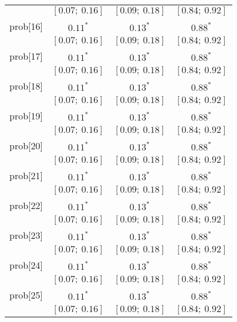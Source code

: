 \begin{table}
\begin{center}
\begin{tabular}{l c c c }
          & $[0.07;\ 0.16]$         & $[0.09;\ 0.18]$         & $[0.84;\ 0.92]$       \\
prob[16]  & $0.11^{*}$              & $0.13^{*}$              & $0.88^{*}$            \\
          & $[0.07;\ 0.16]$         & $[0.09;\ 0.18]$         & $[0.84;\ 0.92]$       \\
prob[17]  & $0.11^{*}$              & $0.13^{*}$              & $0.88^{*}$            \\
          & $[0.07;\ 0.16]$         & $[0.09;\ 0.18]$         & $[0.84;\ 0.92]$       \\
prob[18]  & $0.11^{*}$              & $0.13^{*}$              & $0.88^{*}$            \\
          & $[0.07;\ 0.16]$         & $[0.09;\ 0.18]$         & $[0.84;\ 0.92]$       \\
prob[19]  & $0.11^{*}$              & $0.13^{*}$              & $0.88^{*}$            \\
          & $[0.07;\ 0.16]$         & $[0.09;\ 0.18]$         & $[0.84;\ 0.92]$       \\
prob[20]  & $0.11^{*}$              & $0.13^{*}$              & $0.88^{*}$            \\
          & $[0.07;\ 0.16]$         & $[0.09;\ 0.18]$         & $[0.84;\ 0.92]$       \\
prob[21]  & $0.11^{*}$              & $0.13^{*}$              & $0.88^{*}$            \\
          & $[0.07;\ 0.16]$         & $[0.09;\ 0.18]$         & $[0.84;\ 0.92]$       \\
prob[22]  & $0.11^{*}$              & $0.13^{*}$              & $0.88^{*}$            \\
          & $[0.07;\ 0.16]$         & $[0.09;\ 0.18]$         & $[0.84;\ 0.92]$       \\
prob[23]  & $0.11^{*}$              & $0.13^{*}$              & $0.88^{*}$            \\
          & $[0.07;\ 0.16]$         & $[0.09;\ 0.18]$         & $[0.84;\ 0.92]$       \\
prob[24]  & $0.11^{*}$              & $0.13^{*}$              & $0.88^{*}$            \\
          & $[0.07;\ 0.16]$         & $[0.09;\ 0.18]$         & $[0.84;\ 0.92]$       \\
prob[25]  & $0.11^{*}$              & $0.13^{*}$              & $0.88^{*}$            \\
          & $[0.07;\ 0.16]$         & $[0.09;\ 0.18]$         & $[0.84;\ 0.92]$       \\

\end{tabular}
\end{center}
\end{table}
